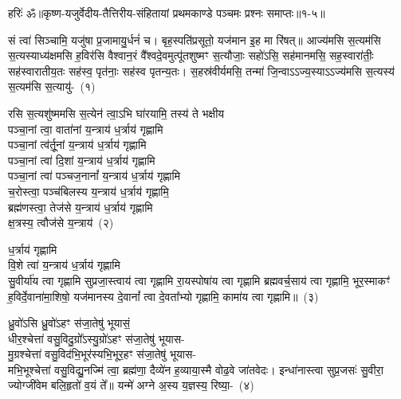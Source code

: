 {\anuvakamend[{दिवा॒ स स॑ह॒स्रिणं॒ वैश्वा॑नरा\-ऽऽ\-दित्य॒ तू नो॑\-ऽने॒हसꣳ॑ सु॒शर्मा॑ण॒मेका॒न्न\-विꣳ॑श॒तिश्च॑}]}%

{हरिः॑ ॐ}{॥कृष्ण-यजुर्वेदीय-तैत्तिरीय-संहितायां प्रथमकाण्डे पञ्चमः प्रश्नः समाप्तः॥१-५॥}



\setcounter{anuvakam}{0}
सं त्वा॑ सिञ्चामि॒ यजु॑षा प्र॒जामायु॒र्धनं॑ च। बृह॒स्पति॑प्रसूतो॒ यज॑मान इ॒ह मा रि॑षत्॥ आज्य॑मसि स॒त्यम॑सि स॒त्यस्याध्य॑क्षमसि ह॒विर॑सि वैश्वान॒रं वै᳚श्वदे॒वमुत्पू॑तशुष्मꣳ स॒त्यौजाः॒ सहो॑\-ऽसि॒ सह॑मानमसि॒ सह॒स्वारा॑तीः॒ सह॑स्वारातीय॒तः सह॑स्व॒ पृत॑नाः॒ सह॑स्व पृतन्य॒तः। स॒हस्र॑वीर्यमसि॒ तन्मा॑ जि॒न्वा\-ऽऽ\-ज्य॒स्या\-ऽऽ\-ज्य॑मसि स॒त्यस्य॑ स॒त्यम॑सि स॒त्यायु॑-~(१)\ip

रसि स॒त्यशु॑ष्ममसि स॒त्येन॑ त्वा॒\-ऽभि घा॑रयामि॒ तस्य॑ ते भक्षीय\\
पञ्चा॒नां त्वा॒ वाता॑नां य॒न्त्राय॑ ध॒र्त्राय॑ गृह्णामि\\
पञ्चा॒नां त्व॑र्तू॒नां य॒न्त्राय॑ ध॒र्त्राय॑ गृह्णामि\\
पञ्चा॒नां त्वा॑ दि॒शां य॒न्त्राय॑ ध॒र्त्राय॑ गृह्णामि\\
पञ्चा॒नां त्वा॑ पञ्चज॒नानां᳚ य॒न्त्राय॑ ध॒र्त्राय॑ गृह्णामि\\
च॒रोस्त्वा॒ पञ्च॑बिलस्य य॒न्त्राय॑ ध॒र्त्राय॑ गृह्णामि॒\\
ब्रह्म॑णस्त्वा॒ तेज॑से य॒न्त्राय॑ ध॒र्त्राय॑ गृह्णामि\\
क्ष॒त्रस्य॒ त्वौज॑से य॒न्त्राय॑~(२)\ip

ध॒र्त्राय॑ गृह्णामि\\
वि॒शे त्वा॑ य॒न्त्राय॑ ध॒र्त्राय॑ गृह्णामि\\
सु॒वीर्या॑य त्वा गृह्णामि सुप्रजा॒स्त्वाय॑ त्वा गृह्णामि रा॒यस्पोषा॑य त्वा गृह्णामि ब्रह्मवर्च॒साय॑ त्वा गृह्णामि॒ भूर॒स्माकꣳ॑ ह॒विर्दे॒वाना॑मा॒शिषो॒ यज॑मानस्य दे॒वानां᳚ त्वा दे॒वता᳚भ्यो गृह्णामि॒ कामा॑य त्वा गृह्णामि॥~(३)\ip

{\anuvakamend[{स॒त्यायु॒रोज॑से य॒न्त्राय॒ त्रय॑स्त्रिꣳशच्च}]}

ध्रु॒वो॑\-ऽसि ध्रु॒वो॑\-ऽहꣳ स॑जा॒तेषु॑ भूयासं॒\\
धीर॒श्चेत्ता॑ वसु॒विदु॒ग्रो᳚\-ऽस्यु॒ग्रो॑\-ऽहꣳ स॑जा॒तेषु॑ भूयास-\\
मु॒ग्रश्चेत्ता॑ वसु॒विद॑भि॒भूर॑स्यभि॒भूर॒हꣳ स॑जा॒तेषु॑ भूयास-\\
मभि॒भूश्चेत्ता॑ वसु॒विद्यु॒नज्मि॑ त्वा॒ ब्रह्म॑णा॒ दैव्ये॑न ह॒व्याया॒स्मै वोढ॒वे जा॑तवेदः। इन्धा॑नास्त्वा सुप्र॒जसः॑ सु॒वीरा॒ ज्योग्जी॑वेम बलि॒हृतो॑ व॒यं ते᳚॥ यन्मे॑ अग्ने अ॒स्य य॒ज्ञस्य॒ रिष्या॒-~(४)\ip

